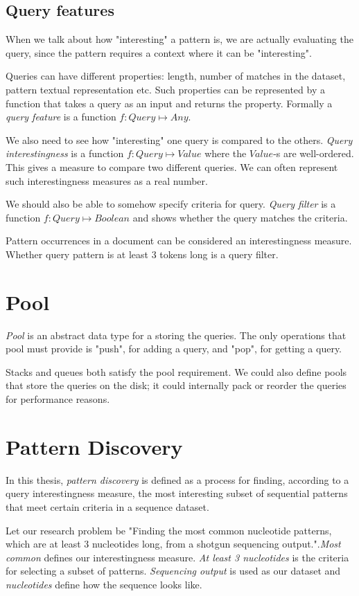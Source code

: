 \subsection{Query features}

When we talk about how "interesting" a pattern is, we are actually evaluating the query, since the pattern requires a context where it can be "interesting".

Queries can have different properties: length, number of matches in the dataset, pattern textual representation etc. Such properties can be represented by a function that takes a query as an input and returns the property. Formally a \emph{query feature} is a function $f: Query \mapsto Any$.

We also need to see how "interesting" one query is compared to the others. \emph{Query interestingness} is a function $f: Query \mapsto Value$ where the $Value$-s are well-ordered. This gives a measure to compare two different queries. We can often represent such interestingness measures as a real number.

We should also be able to somehow specify criteria for query. \emph{Query filter} is a function $f: Query \mapsto Boolean$ and shows whether the query matches the criteria.

\begin{exmp}
Pattern occurrences in a document can be considered an interestingness measure. Whether query pattern is at least 3 tokens long is a query filter.
\end{exmp}

\section{Pool}

\emph{Pool} is an abstract data type for a storing the queries. The only operations that pool must provide is "push", for adding a query, and "pop", for getting a query.

\begin{exmp}
Stacks and queues both satisfy the pool requirement. We could also define pools that store the queries on the disk; it could internally pack or reorder the queries for performance reasons.
\end{exmp}

\section{Pattern Discovery}

In this thesis, \emph{pattern discovery} is defined as a process for finding, according to a query interestingness measure, the most interesting subset of sequential patterns that meet certain criteria in a sequence dataset.

\begin{exmp}
Let our research problem be "Finding the most common nucleotide patterns, which are at least 3 nucleotides long, from a shotgun sequencing output.".\emph{Most common} defines our interestingness measure. \emph{At least 3 nucleotides} is the criteria for selecting a subset of patterns. \emph{Sequencing output} is used as our dataset and \emph{nucleotides} define how the sequence looks like.
\end{exmp}